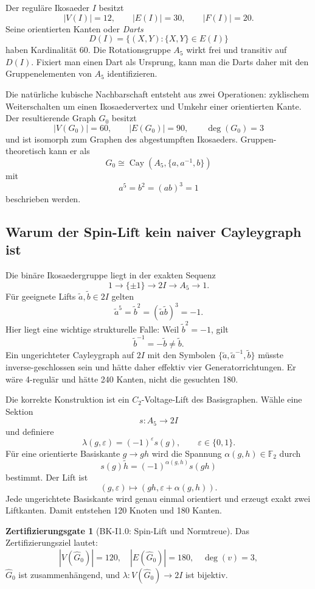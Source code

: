 \documentclass[11pt,a4paper]{article}
\theoremstyle{definition}
\newtheorem{gate}[satz]{Zertifizierungsgate}
\newcommand{\twoI}{2I}
\begin{document}
Der reguläre Ikosaeder \(I\) besitzt
\[
|V(I)|=12,\qquad |E(I)|=30,\qquad |F(I)|=20.
\]
Seine orientierten Kanten oder \emph{Darts}
\[
D(I)=\{(X,Y):\{X,Y\}\in E(I)\}
\]
haben Kardinalität \(60\). Die Rotationsgruppe \(A_5\) wirkt frei und transitiv auf \(D(I)\). Fixiert man einen Dart als Ursprung, kann man die Darts daher mit den Gruppenelementen von \(A_5\) identifizieren.

Die natürliche kubische Nachbarschaft entsteht aus zwei Operationen: zyklischem Weiterschalten um einen Ikosaedervertex und Umkehr einer orientierten Kante. Der resultierende Graph \(G_0\) besitzt
\[
|V(G_0)|=60,\qquad |E(G_0)|=90,\qquad \deg(G_0)=3
\]
und ist isomorph zum Graphen des abgestumpften Ikosaeders. Gruppen-theoretisch kann er als
\[
G_0\cong \operatorname{Cay}\!\left(A_5,\{a,a^{-1},b\}\right)
\]
mit
\[
a^5=b^2=(ab)^3=1
\]
beschrieben werden.

\subsection{Warum der Spin-Lift kein naiver Cayleygraph ist}

Die binäre Ikosaedergruppe liegt in der exakten Sequenz
\[
1\longrightarrow\{\pm1\}\longrightarrow\twoI
\longrightarrow A_5\longrightarrow1.
\]
Für geeignete Lifts \(\tilde a,\tilde b\in\twoI\) gelten
\[
\tilde a^5=\tilde b^2=(\tilde a\tilde b)^3=-1.
\]
Hier liegt eine wichtige strukturelle Falle: Weil \(\tilde b^2=-1\), gilt
\[
\tilde b^{-1}=-\tilde b\neq\tilde b.
\]
Ein ungerichteter Cayleygraph auf \(\twoI\) mit den Symbolen
\(\{\tilde a,\tilde a^{-1},\tilde b\}\) müsste inverse-geschlossen sein und hätte daher effektiv vier Generatorrichtungen. Er wäre 4-regulär und hätte 240 Kanten, nicht die gesuchten 180.

Die korrekte Konstruktion ist ein \(C_2\)-Voltage-Lift des Basisgraphen. Wähle eine Sektion
\[
s:A_5\to\twoI
\]
und definiere
\[
\lambda(g,\varepsilon)=(-1)^\varepsilon s(g),\qquad
\varepsilon\in\{0,1\}.
\]
Für eine orientierte Basiskante \(g\to gh\) wird die Spannung
\(\alpha(g,h)\in\mathbb F_2\) durch
\[
s(g)\tilde h=(-1)^{\alpha(g,h)}s(gh)
\]
bestimmt. Der Lift ist
\[
(g,\varepsilon)\longmapsto
(gh,\varepsilon+\alpha(g,h)).
\]
Jede ungerichtete Basiskante wird genau einmal orientiert und erzeugt exakt zwei Liftkanten. Damit entstehen 120 Knoten und 180 Kanten.

\begin{gate}[BK-I1.0: Spin-Lift und Normtreue]
Das Zertifizierungsziel lautet:
\[
|V(\widehat G_0)|=120,\quad
|E(\widehat G_0)|=180,\quad
\deg(v)=3,
\]
\(\widehat G_0\) ist zusammenhängend, und
\(\lambda:V(\widehat G_0)\to\twoI\) ist bijektiv.
\end{gate}
\end{document}
